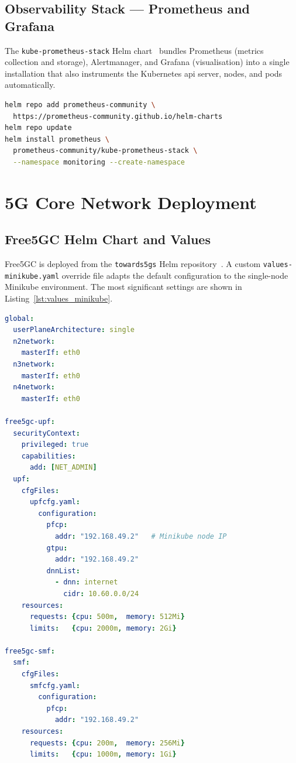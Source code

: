\subsection{Observability Stack — Prometheus and Grafana}

The \texttt{kube-prometheus-stack} Helm chart~\cite{prometheus} bundles Prometheus (metrics collection and storage), Alertmanager, and Grafana (visualisation) into a single installation that also instruments the Kubernetes \gls{api} server, nodes, and pods automatically.

\begin{lstlisting}[language=bash, caption={Installing the kube-prometheus-stack}, label={lst:prometheus_install}]
helm repo add prometheus-community \
  https://prometheus-community.github.io/helm-charts
helm repo update
helm install prometheus \
  prometheus-community/kube-prometheus-stack \
  --namespace monitoring --create-namespace
\end{lstlisting}

\section{5G Core Network Deployment}
\label{sec:core_deploy}

\subsection{Free5GC Helm Chart and Values}

Free5GC is deployed from the \texttt{towards5gs} Helm repository~\cite{towards5gs_helm}. A custom \texttt{values-minikube.yaml} override file adapts the default configuration to the single-node Minikube environment. The most significant settings are shown in Listing~\ref{lst:values_minikube}.

\begin{lstlisting}[language=yaml, caption={Excerpt of values-minikube.yaml: resource limits and UPF PFCP configuration}, label={lst:values_minikube}]
global:
  userPlaneArchitecture: single
  n2network:
    masterIf: eth0
  n3network:
    masterIf: eth0
  n4network:
    masterIf: eth0

free5gc-upf:
  securityContext:
    privileged: true
    capabilities:
      add: [NET_ADMIN]
  upf:
    cfgFiles:
      upfcfg.yaml:
        configuration:
          pfcp:
            addr: "192.168.49.2"   # Minikube node IP
          gtpu:
            addr: "192.168.49.2"
          dnnList:
            - dnn: internet
              cidr: 10.60.0.0/24
    resources:
      requests: {cpu: 500m,  memory: 512Mi}
      limits:   {cpu: 2000m, memory: 2Gi}

free5gc-smf:
  smf:
    cfgFiles:
      smfcfg.yaml:
        configuration:
          pfcp:
            addr: "192.168.49.2"
    resources:
      requests: {cpu: 200m,  memory: 256Mi}
      limits:   {cpu: 1000m, memory: 1Gi}
\end{lstlisting}

